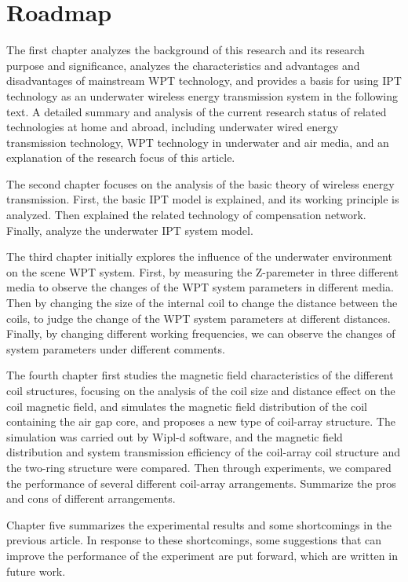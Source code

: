\section{Roadmap}
The first chapter analyzes the background of this research and its research purpose and significance, analyzes the characteristics and advantages and disadvantages of mainstream WPT technology, and provides a basis for using IPT technology as an underwater wireless energy transmission system in the following text. A detailed summary and analysis of the current research status of related technologies at home and abroad, including underwater wired energy transmission technology, WPT technology in underwater and air media, and an explanation of the research focus of this article.

The second chapter focuses on the analysis of the basic theory of wireless energy transmission. First, the basic IPT model is explained, and its working principle is analyzed. Then explained the related technology of compensation network. Finally, analyze the underwater IPT system model.

The third chapter initially explores the influence of the underwater environment on the scene WPT system. First, by measuring the Z-paremeter in three different media to observe the changes of the WPT system parameters in different media. Then by changing the size of the internal coil to change the distance between the coils, to judge the change of the WPT system parameters at different distances. Finally, by changing different working frequencies, we can observe the changes of system parameters under different comments.

The fourth chapter first studies the magnetic field characteristics of the different coil structures, focusing on the analysis of the coil size and distance effect on the coil magnetic field, and simulates the magnetic field distribution of the coil containing the air gap core, and proposes a new type of coil-array structure. The simulation was carried out by Wipl-d software, and the magnetic field distribution and system transmission efficiency of the coil-array coil structure and the two-ring structure were compared. Then through experiments, we compared the performance of several different coil-array arrangements. Summarize the pros and cons of different arrangements.

Chapter five summarizes the experimental results and some shortcomings in the previous article. In response to these shortcomings, some suggestions that can improve the performance of the experiment are put forward, which are written in future work.